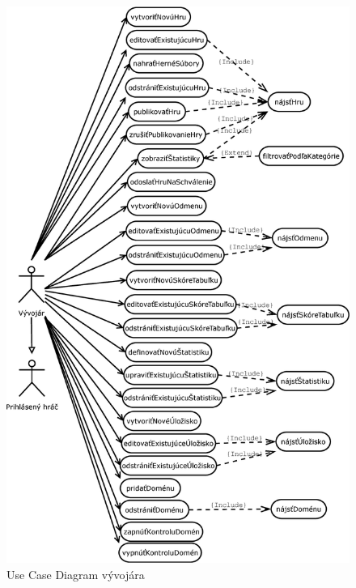 \begin{figure}[h]
  \centering
  \includegraphics[scale=0.40]{fig/ucd-vyvojar.eps}
  \caption{Use Case Diagram vývojára}
  \label{fig:ucdvyvojar}
\end{figure}
\clearpage

